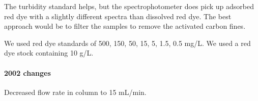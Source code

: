 \documentclass{article} %
\begin{document}
The turbidity standard helps, but the spectrophotometer does pick up adsorbed red dye with a slightly different spectra than dissolved red dye. The best approach would be to filter the samples to remove the activated carbon fines.

We used red dye standards of 500, 150, 50, 15, 5, 1.5, 0.5 mg/L. We used a red dye stock containing 10 g/L.

\noindent 
\paragraph{2002 changes}

Decreased flow rate in column to 15 mL/min.
\end{document}
